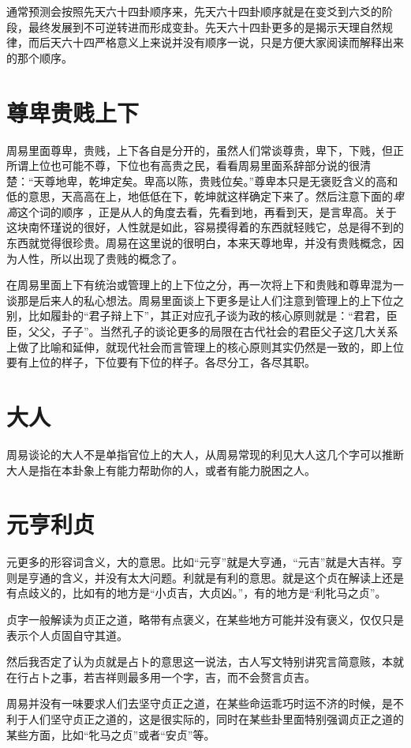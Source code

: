 \documentclass[12pt,oneside]{book}
\begin{document}
通常预测会按照先天六十四卦顺序来，先天六十四卦顺序就是在变爻到六爻的阶段，最终发展到不可逆转进而形成变卦。先天六十四卦更多的是揭示天理自然规律，而后天六十四严格意义上来说并没有顺序一说，只是方便大家阅读而解释出来的那个顺序。

\section{尊卑贵贱上下}
周易里面尊卑，贵贱，上下各自是分开的，虽然人们常谈尊贵，卑下，下贱，但正所谓上位也可能不尊，下位也有高贵之民，看看周易里面系辞部分说的很清楚：“天尊地卑，乾坤定矣。卑高以陈，贵贱位矣。”尊卑本只是无褒贬含义的高和低的意思，天高高在上，地低低在下，乾坤就这样确定下来了。然后注意下面的\emph{卑高}这个词的顺序 ，正是从人的角度去看，先看到地，再看到天，是言卑高。关于这块南怀瑾说的很好，人性就是如此，容易摸得着的东西就轻贱它，总是得不到的东西就觉得很珍贵。周易在这里说的很明白，本来天尊地卑，并没有贵贱概念，因为人性，所以出现了贵贱的概念了。

在周易里面上下有统治或管理上的上下位之分，再一次将上下和贵贱和尊卑混为一谈那是后来人的私心想法。周易里面谈上下更多是让人们注意到管理上的上下位之别，比如履卦的“君子辩上下”，其正对应孔子谈为政的核心原则就是：“君君，臣臣，父父，子子”。当然孔子的谈论更多的局限在古代社会的君臣父子这几大关系上做了比喻和延伸，就现代社会而言管理上的核心原则其实仍然是一致的，即上位要有上位的样子，下位要有下位的样子。各尽分工，各尽其职。

\section{大人}
周易谈论的大人不是单指官位上的大人，从周易常现的利见大人这几个字可以推断大人是指在本卦象上有能力帮助你的人，或者有能力脱困之人。

\section{元亨利贞}
元更多的形容词含义，大的意思。比如“元亨”就是大亨通，“元吉”就是大吉祥。亨则是亨通的含义，并没有太大问题。利就是有利的意思。就是这个贞在解读上还是有点歧义的，比如有的地方是“小贞吉，大贞凶。”，有的地方是“利牝马之贞”。

贞字一般解读为贞正之道，略带有点褒义，在某些地方可能并没有褒义，仅仅只是表示个人贞固自守其道。

然后我否定了认为贞就是占卜的意思这一说法，古人写文特别讲究言简意赅，本就在行占卜之事，若吉祥则最多用一个字，吉，而不会赘言贞吉。

周易并没有一味要求人们去坚守贞正之道，在某些命运乖巧时运不济的时候，是不利于人们坚守贞正之道的，这是很实际的，同时在某些卦里面特别强调贞正之道的某些方面，比如“牝马之贞”或者“安贞”等。
\end{document}
